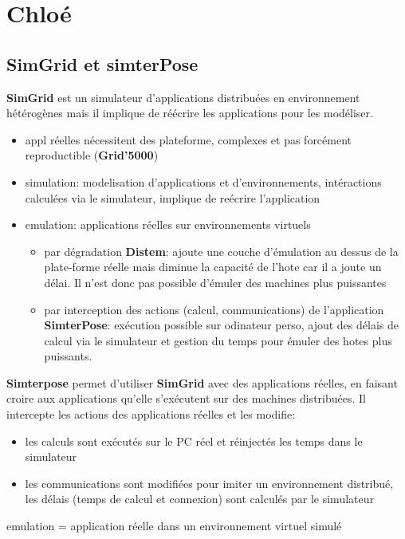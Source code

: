 \documentclass{article}
\begin{document}
\section{Chloé}
\subsection{SimGrid et simterPose}
\textbf{SimGrid} est un simulateur d'applications distribuées en environnement
hétérogènes mais il implique de réécrire les applications pour les modéliser.

\begin{itemize}
\item appl réelles nécessitent des plateforme, complexes et pas forcément
  reproductible (\textbf{Grid'5000})
\item simulation: modelisation d'applications et d'environnements, intéractions
  calculées via le simulateur, implique de reécrire l'application
\item emulation: applications réelles sur environnements virtuels
\begin{itemize}
\item par dégradation \textbf{Distem}: ajoute une couche d'émulation au dessus
  de la plate-forme réelle mais diminue la capacité de l'hote car il a joute un
  délai. Il n'est donc pas possible d'émuler des machines plus puissantes
\item par interception des actions (calcul, communications) de l'application
  \textbf{SimterPose}: exécution possible sur odinateur perso, ajout des délais
  de calcul via le simulateur et gestion du temps pour émuler des hotes plus
  puissants.
\end{itemize}
\end{itemize}

\textbf{Simterpose} permet d'utiliser \textbf{SimGrid} avec des applications
réelles, en faisant croire aux applications qu'elle s'exécutent sur des machines
distribuées. Il intercepte les actions des applications réelles et les modifie:
\begin{itemize}
\item les calculs sont exécutés sur le PC réel et réinjectés les temps dans le
  simulateur
\item les communications sont modifiées pour imiter un environnement distribué,
  les délais (temps de calcul et connexion) sont calculés par le simulateur
\end{itemize}

{\color{red} emulation = application réelle dans un environnement virtuel
  simulé}
\end{document}

